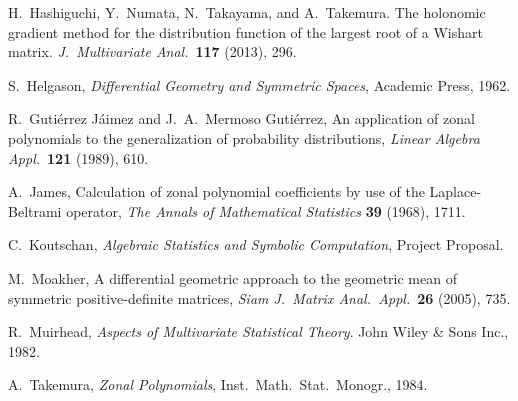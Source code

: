 \documentclass[10pt,oneside,american]{amsart}
\numberwithin{equation}{section}
\numberwithin{figure}{section}
\theoremstyle{definition}
\theoremstyle{remark}
\theoremstyle{plain}
\theoremstyle{definition}
\theoremstyle{plain}
\theoremstyle{plain}
\theoremstyle{plain}
\begin{document}
\begin{thebibliography}{1}
H.~Hashiguchi, Y.~Numata, N.~Takayama, and A.~Takemura.
The holonomic gradient method for the distribution function of the
largest root of a Wishart matrix. \emph{J.~Multivariate Anal.}~\textbf{117}
(2013), 296.

S.~Helgason, \emph{Differential Geometry and Symmetric
Spaces}, Academic Press, 1962.

R.~Guti\'{e}rrez J\'{a}imez and J.~A.~Mermoso
Guti\'{e}rrez, An application of zonal polynomials to the generalization
of probability distributions, \emph{Linear Algebra Appl.}~\textbf{121}
(1989), 610.

A.~James, Calculation of zonal polynomial coefficients
by use of the Laplace-Beltrami operator, \emph{The Annals of Mathematical
Statistics} \textbf{39} (1968), 1711.

C.~Koutschan, \emph{Algebraic Statistics and Symbolic
Computation}, Project Proposal. 

M.~Moakher, A differential geometric approach to
the geometric mean of symmetric positive-definite matrices, \emph{Siam
J.~Matrix Anal.~Appl.}~\textbf{26} (2005), 735.

R.~Muirhead, \emph{Aspects of Multivariate Statistical
Theory}. John Wiley \& Sons Inc., 1982.

A.~Takemura, \emph{Zonal Polynomials}, Inst.~Math.~Stat.~Monogr.,
1984.
\end{thebibliography}
\end{document}
